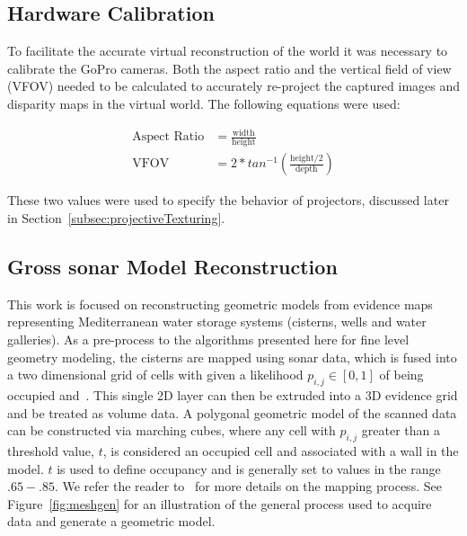 \documentclass[a4paper,twoside]{article}
\begin{document}

\subsection{Hardware Calibration}
To facilitate the accurate virtual reconstruction of the world it was necessary to calibrate the GoPro cameras.
Both the aspect ratio and the vertical field of view (VFOV) needed to be calculated to accurately re-project the captured images and disparity maps in the virtual world.  
The following equations were used:

\begin{align}
\text{Aspect Ratio} &= \frac{\text{width}}{\text{height}} \\
\text{VFOV} &= 2 * tan^{-1}(\frac{\text{height}/2}{\text{depth}})
\end{align}


These two values were used to specify the behavior of projectors, discussed later in Section~\ref{subsec:projectiveTexturing}.

\subsection{{Gross sonar Model Reconstruction}}
\label{sec:reconstruction}

\begin{figure*}[ht!]
   \vspace{-0.2cm}
   \caption{How we generate meshes from sonar models.}
  \label{fig:meshgen}
 \end{figure*}
 
\noindent This work is focused on reconstructing geometric models from evidence maps representing Mediterranean water storage systems (cisterns, wells and water galleries).  As a pre-process to the algorithms presented here for fine level geometry modeling, the cisterns are mapped using sonar data, which is fused into a two dimensional grid of cells with given a likelihood $p_{i,j} \in [0,1]$ of being occupied \cite{Thrun2005} and~\cite{White10}. This single 2D layer can then be extruded into a 3D evidence grid and be treated as volume data.  A polygonal geometric model of the scanned data can be constructed via marching cubes, where any cell with $p_{i,j}$ greater than a threshold value, $t$, is considered an occupied cell and associated with a wall in the model. $t$ is used to define occupancy and is generally set to values in the range $.65-.85$. We refer the reader to~\cite{ICEX11,McVicker,McVicker2} for more details on the mapping process. See Figure~\ref{fig:meshgen} for an illustration of the general process used to acquire data and generate a geometric model.
\end{document}
